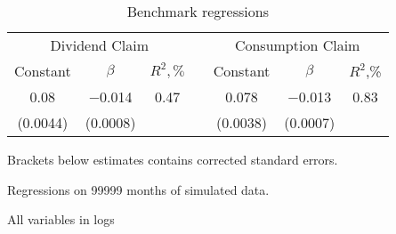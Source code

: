 \begin{table}[H]
 \centering
   \caption{Benchmark regressions}           
   \label{tab:regress1}
 \begin{threeparttable}
 \begin{tabular}{@{}ccccccc@{}}
 \toprule
   \multicolumn{3}{c}{Dividend Claim} && \multicolumn{3}{c}{Consumption Claim} \\ 
 \addlinespace
 Constant  & $\beta$  &  $R^2,\%$     && Constant & $\beta$   &  $R^2$,\%      \\
 \cmidrule(lr){1-3} \cmidrule(lr){5-7}
 0.08      & $-$0.014 & 0.47          && 0.078    & $-$0.013  & 0.83           \\ 
 \addlinespace
 (0.0044)  & (0.0008) &               && (0.0038) & (0.0007)  &                \\
 \bottomrule
 \end{tabular}
 \begin{tablenotes}\footnotesize{
 \item[1] Brackets below estimates contains \citet{NW87} corrected standard errors. 
 \item[2] Regressions on 99999 months of simulated data.
 \item[3] All variables in logs
 }
 \end{tablenotes}
 \end{threeparttable}
 \end{table}